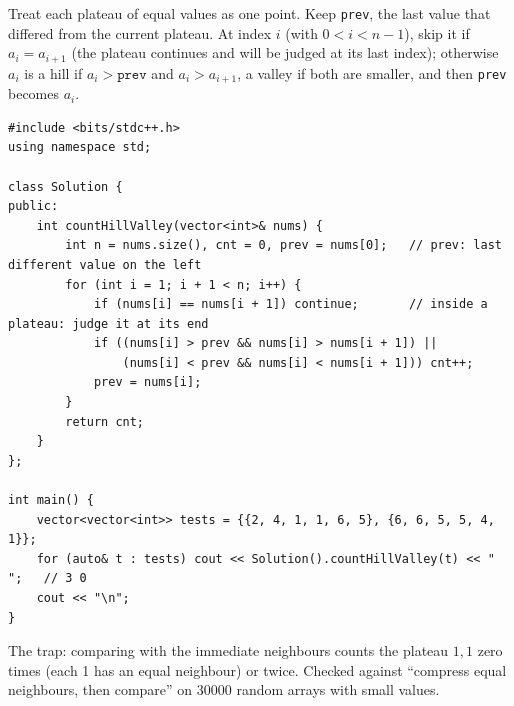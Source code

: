 \begin{solutionbox}
Treat each plateau of equal values as one point. Keep \texttt{prev}, the last value that differed from the current plateau. At index $i$ (with $0 < i < n-1$), skip it if $a_i = a_{i+1}$ (the plateau continues and will be judged at its last index); otherwise $a_i$ is a hill if $a_i > \texttt{prev}$ and $a_i > a_{i+1}$, a valley if both are smaller, and then \texttt{prev} becomes $a_i$.
\begin{lstlisting}[style=cpp]
#include <bits/stdc++.h>
using namespace std;

class Solution {
public:
    int countHillValley(vector<int>& nums) {
        int n = nums.size(), cnt = 0, prev = nums[0];   // prev: last different value on the left
        for (int i = 1; i + 1 < n; i++) {
            if (nums[i] == nums[i + 1]) continue;       // inside a plateau: judge it at its end
            if ((nums[i] > prev && nums[i] > nums[i + 1]) ||
                (nums[i] < prev && nums[i] < nums[i + 1])) cnt++;
            prev = nums[i];
        }
        return cnt;
    }
};

int main() {
    vector<vector<int>> tests = {{2, 4, 1, 1, 6, 5}, {6, 6, 5, 5, 4, 1}};
    for (auto& t : tests) cout << Solution().countHillValley(t) << " ";   // 3 0
    cout << "\n";
}
\end{lstlisting}
\begin{center}
\end{center}
The trap: comparing with the immediate neighbours counts the plateau $1,1$ zero times (each 1 has an equal neighbour) or twice. Checked against ``compress equal neighbours, then compare'' on 30000 random arrays with small values.
\end{solutionbox}

